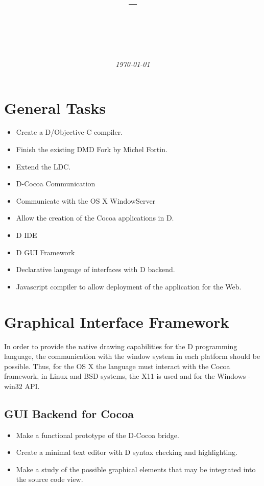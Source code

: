\documentclass[12pt]{article}
\title{
	\ProjectOrganization\ --\ \ProjectName \\
	\vspace{10pt}
	\Huge{\textbf{\PublicationTitle}} \\
	\vspace{20pt}
}
\author{
	\Large{\PublicationAuthors}
	\vspace{5pt} \\
	\texttt{\Contacts}
	\vspace{20pt}
}
\date{\textit{\today}}
\begin{document}
\maketitle

\thispagestyle{empty}

\clearpage



\section{General Tasks}

\begin{itemize}
	\item Create a D/Objective-C compiler.
  	\item Finish the existing DMD Fork by Michel Fortin.
  	\item Extend the LDC.
	\item D-Cocoa Communication
  	\item Communicate with the OS X WindowServer
  	\item Allow the creation of the Cocoa applications in D.
	\item D IDE
	\item D GUI Framework
	\item Declarative language of interfaces with D backend.
	\item Javascript compiler to allow deployment of the application for the Web.
\end{itemize}

\section{Graphical Interface Framework}
In order to provide the native drawing capabilities for the D programming language, the communication with the window system in each platform should be possible. Thus, for the OS X the language must interact with the Cocoa framework, in Linux and BSD systems, the X11 is used and for the Windows - win32 API.

\subsection{GUI Backend for Cocoa}

\begin{itemize}
	\item Make a functional prototype of the D-Cocoa bridge.
	\item Create a minimal text editor with D syntax checking and highlighting.
	\item Make a study of the possible graphical elements that may be integrated into the source code view.
\end{itemize}
\end{document}
